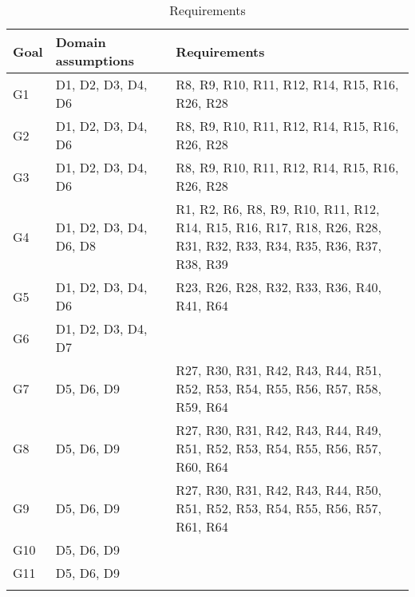 \begin{center}
    \begin{longtable}[H]{|p{0.1\linewidth}|p{0.3\linewidth}|p{0.6\linewidth}|}
     \hline
     \textbf{Goal} & \textbf{Domain assumptions} & \textbf{Requirements}\\
     \hline
     G1 & D1, D2, D3, D4, D6 
        & R8, R9, R10, R11, R12, R14, R15, R16, R26, R28\\
     \hline
     G2 & D1, D2, D3, D4, D6  
        & R8, R9, R10, R11, R12, R14, R15, R16, R26, R28\\
     \hline
     G3 & D1, D2, D3, D4, D6 
        & R8, R9, R10, R11, R12, R14, R15, R16, R26, R28\\
     \hline
     G4 & D1, D2, D3, D4, D6, D8 
        & R1, R2, R6, R8, R9, R10, R11, R12, R14, R15, R16, R17, R18, R26, R28, R31, R32, R33, R34, R35, R36, R37, R38, R39 \\
     \hline
     G5 & D1, D2, D3, D4, D6 
        & R23, R26, R28, R32, R33, R36, R40, R41, R64\\
     \hline
     G6 & D1, D2, D3, D4, D7 
        & \\
     \hline
     G7 & D5, D6, D9
        & R27, R30, R31, R42, R43, R44, R51, R52, R53, R54, R55, R56, R57, R58, R59, R64\\
     \hline
     G8 & D5, D6, D9
        & R27, R30, R31, R42, R43, R44, R49, R51, R52, R53, R54, R55, R56, R57, R60, R64\\
     \hline
     G9 & D5, D6, D9
        & R27, R30, R31, R42, R43, R44, R50, R51, R52, R53, R54, R55, R56, R57, R61, R64\\
     \hline
     G10 & D5, D6, D9
        & \\
     \hline
     G11 & D5, D6, D9
        & \\
     \hline
    \caption{Requirements}
    \label{tab:Requirements}
    \end{longtable}
\end{center}

